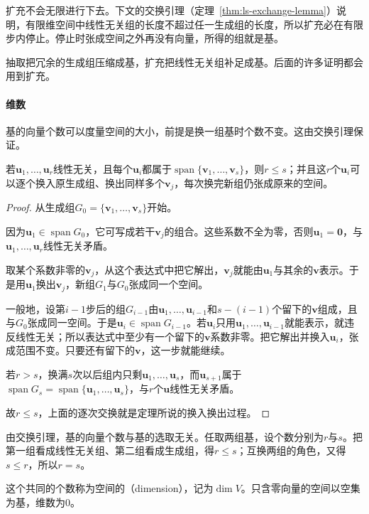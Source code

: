 扩充不会无限进行下去。下文的交换引理（定理~\ref{thm:ls-exchange-lemma}）说明，有限维空间中线性无关组的长度不超过任一生成组的长度，所以扩充必在有限步内停止。停止时张成空间之外再没有向量，所得的组就是基。

抽取把冗余的生成组压缩成基，扩充把线性无关组补足成基。后面的许多证明都会用到扩充。

\paragraph{维数}
\label{sec:ls-dimension}

基的向量个数可以度量空间的大小，前提是换一组基时个数不变。这由交换引理保证。
\begin{theorem}[交换引理]
\label{thm:ls-exchange-lemma}
若$\bm u_1,\ldots,\bm u_r$线性无关，且每个$\bm u_i$都属于$\operatorname{span}\{\bm v_1,\ldots,\bm v_s\}$，则$r\leq s$；并且这$r$个$\bm u_i$可以逐个换入原生成组、换出同样多个$\bm v_j$，每次换完新组仍张成原来的空间。
\end{theorem}
\begin{proof}
从生成组$G_0=\{\bm v_1,\ldots,\bm v_s\}$开始。

因为$\bm u_1\in\operatorname{span}G_0$，它可写成若干$\bm v_j$的组合。这些系数不全为零，否则$\bm u_1=\bm0$，与$\bm u_1,\ldots,\bm u_r$线性无关矛盾。

取某个系数非零的$\bm v_j$，从这个表达式中把它解出，$\bm v_j$就能由$\bm u_1$与其余的$\bm v$表示。于是用$\bm u_1$换出$\bm v_j$，新组$G_1$与$G_0$张成同一个空间。

一般地，设第$i-1$步后的组$G_{i-1}$由$\bm u_1,\ldots,\bm u_{i-1}$和$s-(i-1)$个留下的$\bm v$组成，且与$G_0$张成同一空间。于是$\bm u_i\in\operatorname{span}G_{i-1}$。若$\bm u_i$只用$\bm u_1,\ldots,\bm u_{i-1}$就能表示，就违反线性无关；所以表达式中至少有一个留下的$\bm v$系数非零。把它解出并换入$\bm u_i$，张成范围不变。只要还有留下的$\bm v$，这一步就能继续。

若$r>s$，换满$s$次以后组内只剩$\bm u_1,\ldots,\bm u_s$，而$\bm u_{s+1}$属于$\operatorname{span}G_s=\operatorname{span}\{\bm u_1,\ldots,\bm u_s\}$，与$r$个$\bm u$线性无关矛盾。

故$r\leq s$，上面的逐次交换就是定理所说的换入换出过程。
\end{proof}

由交换引理，基的向量个数与基的选取无关。任取两组基，设个数分别为$r$与$s$。把第一组看成线性无关组、第二组看成生成组，得$r\leq s$；互换两组的角色，又得$s\leq r$，所以$r=s$。

这个共同的个数称为空间的（dimension），记为$\dim V$。只含零向量的空间以空集为基，维数为$0$。

